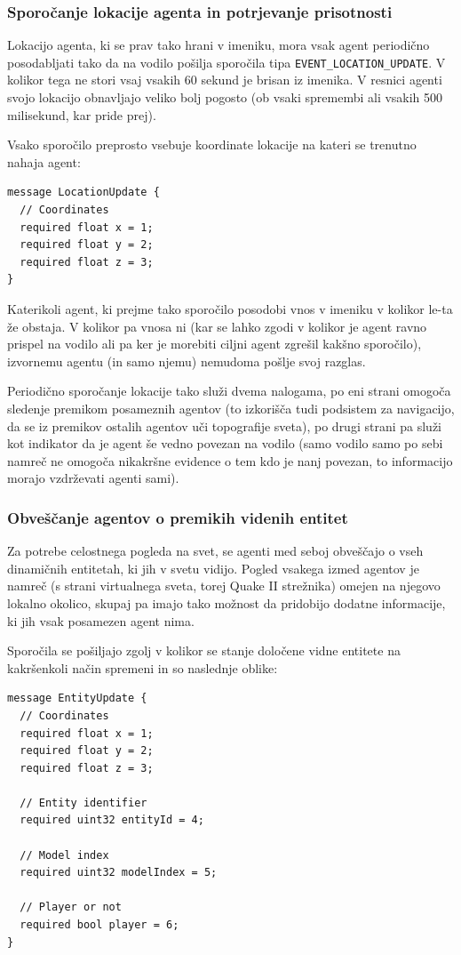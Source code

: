 \documentclass[a4paper,10pt]{article}
\begin{document}
\subsubsection{Sporočanje lokacije agenta in potrjevanje prisotnosti}

Lokacijo agenta, ki se prav tako hrani v imeniku, mora vsak agent periodično posodabljati tako da na vodilo pošilja sporočila tipa \texttt{EVENT\_LOCATION\_UPDATE}. V kolikor tega ne stori vsaj vsakih 60 sekund je brisan iz imenika. V resnici agenti svojo lokacijo obnavljajo veliko bolj pogosto (ob vsaki spremembi ali vsakih 500 milisekund, kar pride prej).

Vsako sporočilo preprosto vsebuje koordinate lokacije na kateri se trenutno nahaja agent:
\begin{verbatim}
message LocationUpdate {
  // Coordinates
  required float x = 1;
  required float y = 2;
  required float z = 3;
}
\end{verbatim}

\noindent
Katerikoli agent, ki prejme tako sporočilo posodobi vnos v imeniku v kolikor le-ta že obstaja. V kolikor pa vnosa ni (kar se lahko zgodi v kolikor je agent ravno prispel na vodilo ali pa ker je morebiti ciljni agent zgrešil kakšno sporočilo), izvornemu agentu (in samo njemu) nemudoma pošlje svoj razglas.

Periodično sporočanje lokacije tako služi dvema nalogama, po eni strani omogoča sledenje premikom posameznih agentov (to izkorišča tudi podsistem za navigacijo, da se iz premikov ostalih agentov uči topografije sveta), po drugi strani pa služi kot indikator da je agent še vedno povezan na vodilo (samo vodilo samo po sebi namreč ne omogoča nikakršne evidence o tem kdo je nanj povezan, to informacijo morajo vzdrževati agenti sami).

\subsubsection{Obveščanje agentov o premikih videnih entitet}

Za potrebe celostnega pogleda na svet, se agenti med seboj obveščajo o vseh dinamičnih entitetah, ki jih v svetu vidijo. Pogled vsakega izmed agentov je namreč (s strani virtualnega sveta, torej Quake II strežnika) omejen na njegovo lokalno okolico, skupaj pa imajo tako možnost da pridobijo dodatne informacije, ki jih vsak posamezen agent nima.

Sporočila se pošiljajo zgolj v kolikor se stanje določene vidne entitete na kakršenkoli način spremeni in so naslednje oblike:
\begin{verbatim}
message EntityUpdate {
  // Coordinates
  required float x = 1;
  required float y = 2;
  required float z = 3;
  
  // Entity identifier
  required uint32 entityId = 4;
  
  // Model index
  required uint32 modelIndex = 5;
  
  // Player or not
  required bool player = 6;
}
\end{verbatim}
\end{document}
